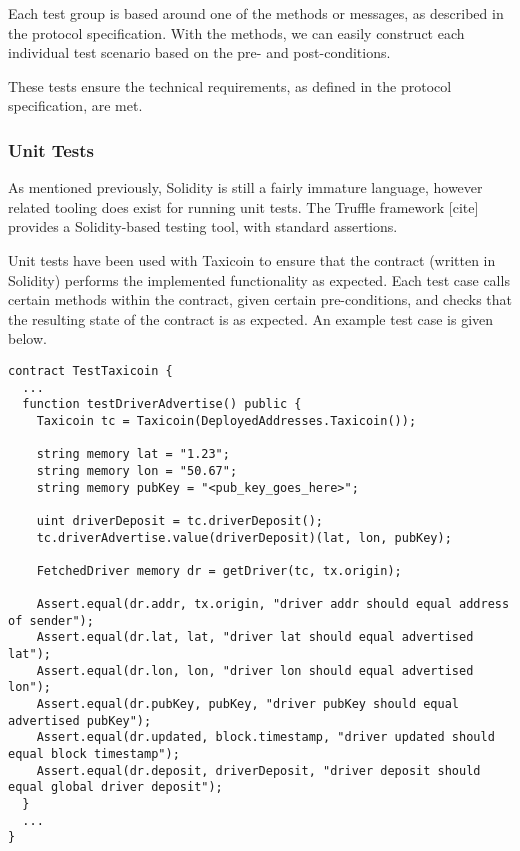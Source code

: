 
Each test group is based around one of the methods or messages, as described in the protocol specification. With the methods, we can easily construct each individual test scenario based on the pre- and post-conditions.


These tests ensure the technical requirements, as defined in the protocol specification, are met.

\subsubsection{Unit Tests}


As mentioned previously, Solidity is still a fairly immature language, however related tooling does exist for running unit tests. The Truffle framework [cite] provides a Solidity-based testing tool, with standard assertions.

Unit tests have been used with Taxicoin to ensure that the contract (written in Solidity) performs the implemented functionality as expected. Each test case calls certain methods within the contract, given certain pre-conditions, and checks that the resulting state of the contract is as expected. An example test case is given below.

\begin{lstlisting}[language=Solidity]
contract TestTaxicoin {
  ...
  function testDriverAdvertise() public {
    Taxicoin tc = Taxicoin(DeployedAddresses.Taxicoin());

    string memory lat = "1.23";
    string memory lon = "50.67";
    string memory pubKey = "<pub_key_goes_here>";

    uint driverDeposit = tc.driverDeposit();
    tc.driverAdvertise.value(driverDeposit)(lat, lon, pubKey);

    FetchedDriver memory dr = getDriver(tc, tx.origin);

    Assert.equal(dr.addr, tx.origin, "driver addr should equal address of sender");
    Assert.equal(dr.lat, lat, "driver lat should equal advertised lat");
    Assert.equal(dr.lon, lon, "driver lon should equal advertised lon");
    Assert.equal(dr.pubKey, pubKey, "driver pubKey should equal advertised pubKey");
    Assert.equal(dr.updated, block.timestamp, "driver updated should equal block timestamp");
    Assert.equal(dr.deposit, driverDeposit, "driver deposit should equal global driver deposit");
  }
  ...
}
\end{lstlisting}

